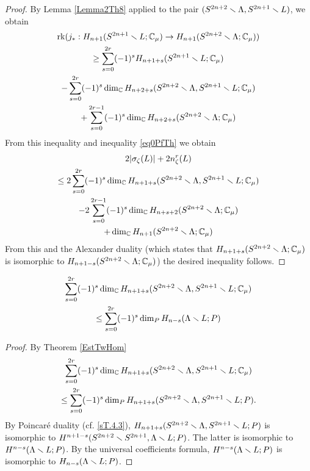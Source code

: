 \documentclass{article}
\numberwithin{equation}{section}
\begin{document}
\begin{proof}By Lemma \ref{Lemma2Th8} 
applied to the pair
$(S^{2n+2}\smallsetminus\Lambda,S^{2n+1}\smallsetminus L)$, we obtain
\begin{multline}\operatorname{rk}(j_*:H_{n+1}(S^{2n+1}\smallsetminus L;\mathbb C_\mu)
\to H_{n+1}(S^{2n+2}\smallsetminus\Lambda;\mathbb C_\mu))\\
\ge 
\sum_{s=0}^{2r}(-1)^sH_{n+1+s}(S^{2n+1}\smallsetminus L;\mathbb C_\mu)\\
-\sum_{s=0}^{2r}(-1)^s\dim_\mathbb C
H_{n+2+s}(S^{2n+2}\smallsetminus\Lambda,S^{2n+1}\smallsetminus L;\mathbb C_\mu)\\
+\sum_{s=0}^{2r-1}(-1)^s\dim_\mathbb C H_{n+2+s}(S^{2n+2}\smallsetminus\Lambda;\mathbb C_\mu)
\end{multline}
From this inequality and inequality \eqref{eq0PfTh} we obtain
\begin{multline}\label{eq2PfTh}
2|\sigma_\zeta(L)|+2n^r_\zeta(L)\\
\le 2\sum_{s=0}^{2r}(-1)^s\dim_\mathbb C
H_{n+1+s}(S^{2n+2}\smallsetminus\Lambda,S^{2n+1}\smallsetminus L;\mathbb C_\mu)\\
-2\sum_{s=0}^{2r-1}(-1)^s\dim_\mathbb C H_{n+s+2}(S^{2n+2}\smallsetminus\Lambda;\mathbb C_\mu)\\
+\dim_\mathbb C H_{n+1}(S^{2n+2}\smallsetminus\Lambda;\mathbb C_\mu)
\end{multline}
From this and the Alexander duality (which states that
$H_{n+1+s}(S^{2n+2}\smallsetminus\Lambda;\mathbb C_\mu)$ is isomorphic to
$H_{n+1-s}(S^{2n+2}\smallsetminus\Lambda;\mathbb C_{\mu})$) 
the desired inequality follows. 
\end{proof}

\begin{lem}\label{Lemma3Th}
\begin{multline}
\sum_{s=0}^{2r}(-1)^s
\dim_\mathbb C H_{n+1+s}(S^{2n+2}\smallsetminus\Lambda,S^{2n+1}\smallsetminus L;\mathbb C_\mu)\\
\le
\sum_{s=0}^{2r}(-1)^s\dim_P H_{n-s}(\Lambda\smallsetminus L;P)
\end{multline}
\end{lem}

\begin{proof}
By Theorem \ref{EstTwHom}
\begin{multline}
\sum_{s=0}^{2r}(-1)^s
\dim_\mathbb C H_{n+1+s}(S^{2n+2}\smallsetminus\Lambda,S^{2n+1}\smallsetminus L;\mathbb C_\mu)\\
\le
\sum_{s=0}^{2r}(-1)^s
\dim_P H_{n+1+s}(S^{2n+2}\smallsetminus\Lambda,S^{2n+1}\smallsetminus L;P).
\end{multline}
By Poincar\'{e} duality (cf. \ref{sT.4.3}),
$H_{n+1+s}(S^{2n+2}\smallsetminus\Lambda,S^{2n+1}\smallsetminus L;P)$
is isomorphic to $H^{n+1-s}(S^{2n+2}\smallsetminus S^{2n+1},\Lambda\smallsetminus L;P)$.
The latter is isomorphic to $H^{n-s}(\Lambda\smallsetminus L;P)$. By the universal
coefficients formula, $H^{n-s}(\Lambda\smallsetminus L;P)$ is isomorphic to 
$H_{n-s}(\Lambda\smallsetminus L;P)$.
\end{proof}
\end{document}

